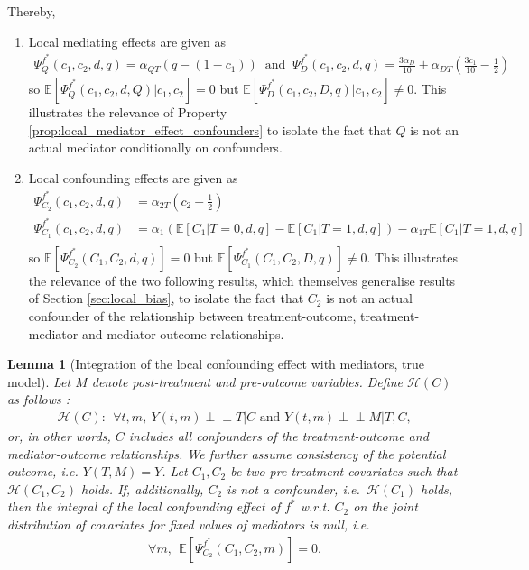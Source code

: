 \documentclass{article}
\theoremstyle{plain}
\newtheorem{lemma}[theorem]{Lemma}
\theoremstyle{definition}
\theoremstyle{remark}
\newcommand{\effect}{\Psi}
\theoremstyle{mystyle}
\newcommand{\indep}{\perp\!\!\!\!\perp}
\begin{document}
Thereby,
\begin{enumerate}
    \item Local mediating effects are given as
    \begin{align*}
        \effect^{f^*}_{Q}(c_1,c_2,d,q) = \alpha_{QT}(q - (1-c_1)) \ \text{ and } \ \effect^{f^*}_{D}(c_1,c_2,d,q) = \frac{3\alpha_D}{10} + \alpha_{DT}(\frac{3c_1}{10} - \frac{1}{2})
    \end{align*}
    so $\mathbb{E}[\effect^{f^*}_{Q}(c_1,c_2,d,Q) | c_1, c_2] = 0$ but $\mathbb{E}[\effect^{f^*}_{D}(c_1,c_2,D,q) | c_1, c_2] \neq 0$. This illustrates the relevance of Property \ref{prop:local_mediator_effect_confounders} to isolate the fact that $Q$ is not an actual mediator conditionally on confounders.
    \item Local confounding effects are given as
    \begin{align*}
        \effect^{f^*}_{C_2}(c_1,c_2,d,q) &= \alpha_{2T}(c_2 - \frac{1}{2}) \\
        \effect^{f^*}_{C_1}(c_1,c_2,d,q) &= \alpha_1(\mathbb{E}[C_1|T=0,d,q] - \mathbb{E}[C_1|T=1,d,q]) - \alpha_{1T}\mathbb{E}[C_1|T=1,d,q] \\
    \end{align*}
    so $\mathbb{E}[\effect^{f^*}_{C_2}(C_1,C_2,d,q)] = 0$ but $\mathbb{E}[\effect^{f^*}_{C_1}(C_1,C_2,D,q)] \neq 0$. This illustrates the relevance of the two following results, which themselves generalise results of Section \ref{sec:local_bias}, to isolate the fact that $C_2$ is not an actual confounder of the relationship between treatment-outcome, treatment-mediator and mediator-outcome relationships.
    \end{enumerate}
    \begin{lemma}[Integration of the local confounding effect with mediators, true model] \label{lemma:local_confounding_effect_mediators}
 Let $M$ denote post-treatment and pre-outcome variables. Define $\mathcal{H}(C)$ as follows :
 \begin{align*}
 \mathcal{H}(C) : \ \ \forall t, m, \ Y(t,m) \indep T | C \text{ and } Y(t,m) \indep M | T, C,
 \end{align*}
 or, in other words, $C$ includes all confounders of the treatment-outcome and mediator-outcome relationships. We further assume consistency of the potential outcome, i.e. $Y(T,M) = Y$. Let $C_1, C_2$ be two pre-treatment covariates such that $\mathcal{H}(C_1, C_2)$ holds. If, additionally, $C_2$ is not a confounder, i.e.\ $\mathcal{H}(C_1)$ holds, then the integral of the local confounding effect of $f^*$ w.r.t. $C_2$ on the joint distribution of covariates for fixed values of mediators is null, i.e.
\begin{align*}
    \forall m, \ \ \mathbb{E}[\effect^{f^*}_{C_2}(C_1,C_2,m)] = 0.
\end{align*}
\end{lemma}
\end{document}

